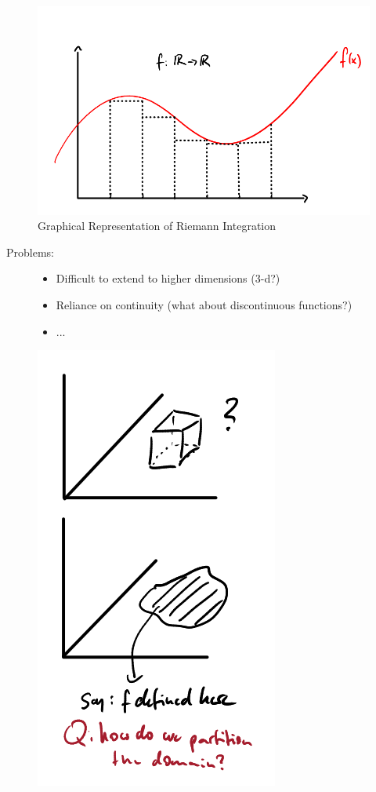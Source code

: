 \documentclass[10pt,a4paper]{article}
\theoremstyle{definition}
\theoremstyle{plain}
\begin{document}
\begin{figure}[H]
	\centering
	\includegraphics[width=0.7\linewidth]{riemann_idea}
	\caption{Graphical Representation of Riemann Integration}
	\label{fig:riemannidea}
\end{figure}
Problems:
\begin{figure}[H]
\begin{itemize}
	\item Difficult to extend to higher dimensions (3-d?)
	\item Reliance on continuity (what about discontinuous functions?)
	\item ...
\end{itemize}
\endminipage\hfill
{}
	\includegraphics[width=.5\linewidth]{riemann_problems}
	\label{fig:riemann_problems}
\endminipage\hfill
\end{figure}
\end{document}

